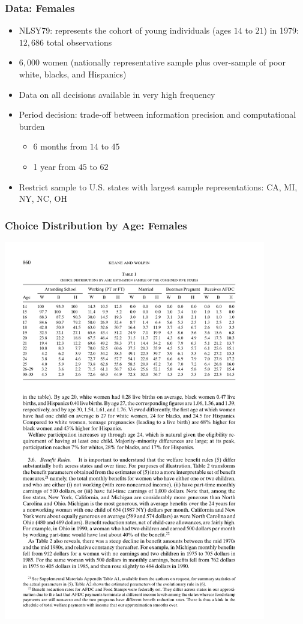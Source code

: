 \begin{frame}
	\frametitle{Data: Females}
		\begin{itemize}
			\item NLSY79: represents the cohort of young individuals (ages $14$ to $21$) in 1979: $12,686$ total observations 
			\item $6,000$ women (nationally representative sample plus over-sample of poor white, blacks, and Hispanics)
			\item Data on all decisions available in very high frequency
			\item Period decision: trade-off between information precision and computational burden
			\begin{itemize}
				\item 6 months from $14$ to $45$
				\item 1 year from $45$ to $62$
			\end{itemize}						
			\item Restrict sample to U.S. states with largest sample representations: CA, MI, NY, NC, OH
		\end{itemize}
\end{frame}

\begin{frame}
	\frametitle{Choice Distribution by Age: Females}
	\includegraphics[width=4.5in]{tab-figs/table1_2010.pdf}
\end{frame}

